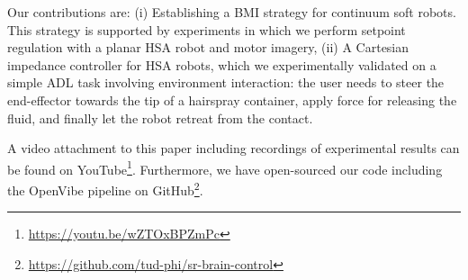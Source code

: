 Our contributions are: (i) Establishing a \gls{BMI} strategy for continuum soft robots. This strategy is supported by experiments in which we perform setpoint regulation with a planar \gls{HSA} robot and motor imagery, (ii) A Cartesian impedance controller for \gls{HSA} robots, which we experimentally validated on a simple \gls{ADL} task involving environment interaction: the user needs to steer the end-effector towards the tip of a hairspray container, apply force for releasing the fluid, and finally let the robot retreat from the contact.          

A video attachment to this paper including recordings of experimental results can be found on YouTube\footnote{\url{https://youtu.be/wZTOxBPZmPc}}.
Furthermore, we have open-sourced our code including the OpenVibe pipeline on GitHub\footnote{\url{https://github.com/tud-phi/sr-brain-control}}.